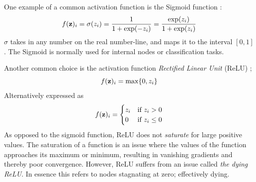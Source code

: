One example of a common activation function is the Sigmoid function \citep[Logistic Regression]{morten}: 
\begin{equation}\label{sigmoid}
    f(\bold{z})_i=\sigma(z_i)=\frac{1}{1+\exp(-z_i)}=\frac{\exp(z_i)}{1+\exp(z_i)}
\end{equation}
$\sigma$ takes in any number on the real number-line, and maps it to the interval $[0,1]$. The Sigmoid is normally used for internal nodes or classification tasks. 

Another common choice is the activation function \textit{Rectified Linear Unit} (ReLU) \citep[Building a feed forward neural network]{morten}; 
\begin{equation}\label{relu}
    f(\bold{z})_i=\max\{0, z_i\}
\end{equation}
Alternatively expressed as
\begin{equation}
    f(\bold{z})_i = \begin{cases} 
      z_i & \text{if } z_i > 0 \\
      0 & \text{if } z_i \leq 0 
   \end{cases}    
\end{equation}
As opposed to the sigmoid function, ReLU does not \textit{saturate} for large positive values. The saturation of a function is an issue where the values of the function approaches its maximum or minimum, resulting in vanishing gradients and thereby poor convergence. However, ReLU suffers from an issue called \textit{the dying ReLU}. In essence this refers to nodes stagnating at zero; effectively dying. 

